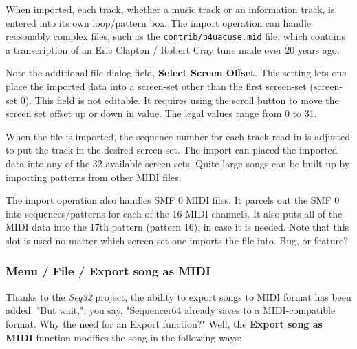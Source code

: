    When imported, each track, whether a music track or an information track,
   is entered into its own loop/pattern box.  The import operation can
   handle reasonably complex files,
   such as the \texttt{contrib/b4uacuse.mid} file, which contains
   a transcription of an Eric Clapton / Robert Cray tune made over 20 years ago.

   Note the additional file-dialog field,
   \textbf{Select Screen Offset}.
   This setting lets one place the imported data into a screen-set other than
   the first screen-set (screen-set 0).
   This field is not editable.  It requires using the scroll button to move the
   screen set offset up or down in value.  The legal values range from 0
   to 31.

   When the file is imported, the sequence number for each track read in is
   adjusted to put the track in the desired screen-set.
   The import can placed the imported data into any of the 32 available
   screen-sets.  Quite large songs can be built up by importing patterns from
   other MIDI files.

   The import operation also handles SMF 0 MIDI files.  It parcels out the SMF
   0 into sequences/patterns for each of the 16 MIDI channels.  It also puts
   all of the MIDI data into the 17th pattern (pattern 16), in case it is
   needed.  Note that this slot is used no matter which screen-set one imports
   the file into.  Bug, or feature?

\subsubsection{Menu / File / Export song as MIDI}
\label{subsubsec:seq64_menu_file_export}

   Thanks to the \textsl{Seq32} project, the ability to export songs to MIDI
   format has been added.
   "But wait,", you say, "Sequencer64 already saves to a MIDI-compatible
   format.  Why the need for an Export function?"
   Well, the \textbf{Export song as MIDI} function modifies the song in the
   following ways:

